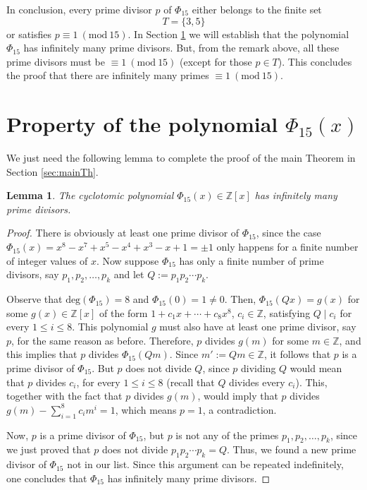 \documentclass[a4paper, 12pt]{article}
\newtheorem{lemma}[theorem]{Lemma}
\theoremstyle{definition}
\newcommand{\Z}{\ensuremath{\mathbb{Z}}}
\newcommand{\Mod}[1]{\ (\mathrm{mod}\ #1)} %
\begin{document}
In conclusion, every prime divisor $p$ of $\Phi_{15}$ either belongs to the finite set 
\begin{equation*}
T=\{3, 5\}
\end{equation*}
or satisfies $p\equiv 1 \Mod{15}$. In Section \ref{sec:properties} we will establish that the polynomial $\Phi_{15}$ has infinitely many prime divisors. But, from the remark above, all these prime divisors must be $\equiv 1\Mod{15}$ (except for those $p\in T$). This concludes the proof that there are infinitely many primes $\equiv 1 \Mod{15}$.

\section{Property of the polynomial \texorpdfstring{$\Phi_{15}(x)$}{Pkx}}\label{sec:properties}

We just need the following lemma to complete the proof of the main Theorem in Section \ref{sec:mainTh}.

\begin{lemma}
The cyclotomic polynomial $\Phi_{15}(x)\in\Z[x]$ has infinitely many prime divisors.
\end{lemma}
\begin{proof}
There is obviously at least one prime divisor of $\Phi_{15}$, since the case $\Phi_{15}(x)=x^{8} - x^{7} + x^{5} - x^{4} + x^{3} - x + 1=\pm 1$ only happens for a finite number of integer values of $x$. Now suppose $\Phi_{15}$ has only a finite number of prime divisors, say $p_1, p_2,\dots,p_k$ and let $Q:=p_1p_2\cdots p_k$. 

Observe that $\text{deg}(\Phi_{15})=8$ and $\Phi_{15}(0)=1\neq 0$. Then, $\Phi_{15}(Qx)=g(x)$ for some $g(x)\in\Z[x]$ of the form $1+c_1x+\cdots+c_{8}x^{8}$, $c_i\in\Z$, satisfying $Q\mid c_i$ for every $1\leqslant i \leqslant 8$. This polynomial $g$ must also have at least one prime divisor, say $p$, for the same reason as before. Therefore, $p$ divides $g(m)$ for some $m\in\Z$, and this implies that $p$ divides $\Phi_{15}(Qm)$. Since $m':=Qm\in\Z$, it follows that $p$ is a prime divisor of $\Phi_{15}$. But $p$ does not divide $Q$, since $p$ dividing $Q$ would mean that $p$ divides $c_i$, for every $1\leqslant i \leqslant 8$ (recall that $Q$ divides every $c_i$). This, together with the fact that $p$ divides $g(m)$, would imply that $p$ divides $g(m) - \sum_{i=1}^{8}c_im^i=1$, which means $p=1$, a contradiction. 

Now, $p$ is a prime divisor of $\Phi_{15}$, but $p$ is not any of the primes $p_1,p_2,\dots,p_k$, since we just proved that $p$ does not divide $p_1p_2\cdots p_k=Q$. Thus, we found a new prime divisor of $\Phi_{15}$ not in our list. Since this argument can be repeated indefinitely, one concludes that $\Phi_{15}$ has infinitely many prime divisors.
\end{proof}
\end{document}
